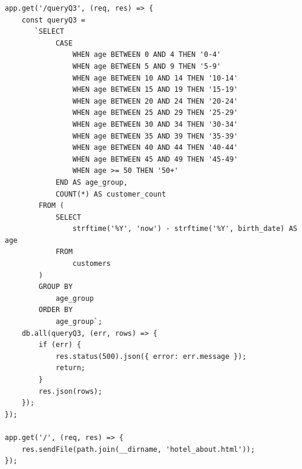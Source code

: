 \documentclass{report}
\begin{document}
\begin{verbatim}
app.get('/queryQ3', (req, res) => {
    const queryQ3 = 
       `SELECT 
            CASE 
                WHEN age BETWEEN 0 AND 4 THEN '0-4'
                WHEN age BETWEEN 5 AND 9 THEN '5-9'
                WHEN age BETWEEN 10 AND 14 THEN '10-14'
                WHEN age BETWEEN 15 AND 19 THEN '15-19'
                WHEN age BETWEEN 20 AND 24 THEN '20-24'
                WHEN age BETWEEN 25 AND 29 THEN '25-29'
                WHEN age BETWEEN 30 AND 34 THEN '30-34'
                WHEN age BETWEEN 35 AND 39 THEN '35-39'
                WHEN age BETWEEN 40 AND 44 THEN '40-44'
                WHEN age BETWEEN 45 AND 49 THEN '45-49'
                WHEN age >= 50 THEN '50+'
            END AS age_group,
            COUNT(*) AS customer_count
        FROM (
            SELECT 
                strftime('%Y', 'now') - strftime('%Y', birth_date) AS age
            FROM 
                customers
        )
        GROUP BY 
            age_group
        ORDER BY 
            age_group`;
    db.all(queryQ3, (err, rows) => {
        if (err) {
            res.status(500).json({ error: err.message });
            return;
        }
        res.json(rows);
    });
});

app.get('/', (req, res) => {
    res.sendFile(path.join(__dirname, 'hotel_about.html'));
});
\end{verbatim}
\end{document}
